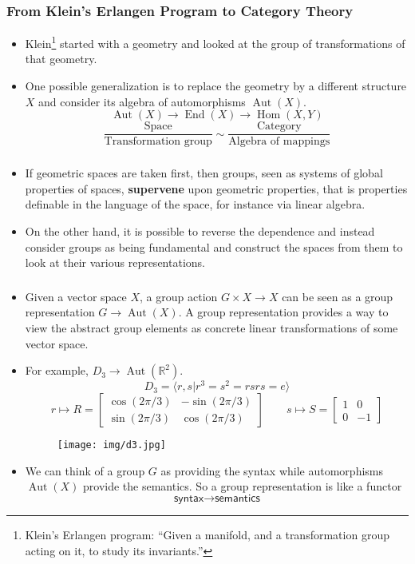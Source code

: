 \documentclass[UTF8,11pt,colorlinks,compress,openany]{beamer}%
\begin{document}
\begin{frame}\frametitle{From Klein's Erlangen Program to Category Theory}
\begin{itemize}
	\item Klein\footnote{Klein's Erlangen program: ``Given a manifold, and a transformation group acting on it, to study its invariants.''} started with a geometry and looked at the group of transformations of that geometry.
	\item One possible generalization is to replace the geometry by a different structure $X$ and consider its algebra of automorphisms $\operatorname{Aut}(X)$.
	\[\operatorname{Aut}(X)\to \operatorname{End}(X)\to \operatorname{Hom}(X,Y)\]
	\[\dfrac{\text{Space}}{\text{Transformation group}} \sim \dfrac{\text{Category}}{\text{Algebra of mappings}}\]
\end{itemize}
\end{frame}

\begin{frame}\frametitle{}
\begin{itemize}
	\item If geometric spaces are taken first, then groups, seen as systems of global properties of spaces, \textbf{supervene} upon geometric properties, that is properties definable in the language of the space, for instance via linear algebra.
	\item On the other hand, it is possible to reverse the dependence and instead consider groups as being fundamental and construct the spaces from them to look at their various representations.
\end{itemize}
\end{frame}

\begin{frame}\frametitle{}
\begin{itemize}
	\item Given a vector space $X$, a group action $G\times X\to X$ can be seen as a group representation $G\to \operatorname{Aut}(X)$. A group representation provides a way to view the abstract group elements as concrete linear transformations of some vector space.
	\item For example, $D_3\to\operatorname{Aut}(\mathbb{R}^2)$.
\[D_3=\langle r,s|r^3=s^2=rsrs=e\rangle\]
\[r\mapsto R=
\begin{bmatrix}
	\cos(2\pi/3) & -\sin(2\pi/3)\\
	\sin(2\pi/3) & \cos(2\pi/3)
\end{bmatrix}\qquad
s\mapsto S=
\begin{bmatrix}
	1 & 0\\
	0 & -1
\end{bmatrix}
\]
\begin{figure}[H]
	\texttt{[image: img/d3.jpg]}
\end{figure}
	\item We can think of a group $G$ as providing the syntax while automorphisms $\operatorname{Aut}(X)$ provide the semantics. So a group representation is like a functor
\[\textsf{syntax} \to \textsf{semantics}\]
\end{itemize}
\end{frame}
\end{document}
